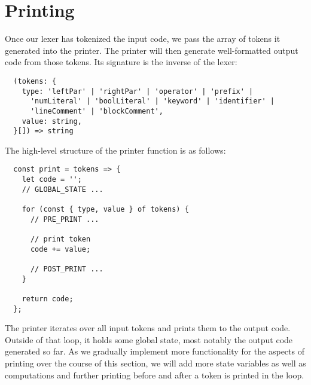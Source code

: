 \section{Printing}
Once our lexer has tokenized the input code,
we pass the array of tokens it generated into the printer.
The printer will then generate well-formatted output code from those tokens.
Its signature is the inverse of the lexer:
\begin{verbatim}
  (tokens: {
    type: 'leftPar' | 'rightPar' | 'operator' | 'prefix' |
      'numLiteral' | 'boolLiteral' | 'keyword' | 'identifier' |
      'lineComment' | 'blockComment',
    value: string,
  }[]) => string
\end{verbatim}

The high-level structure of the printer function is as follows:
\begin{verbatim}
  const print = tokens => {
    let code = '';
    // GLOBAL_STATE ...

    for (const { type, value } of tokens) {
      // PRE_PRINT ...

      // print token
      code += value;

      // POST_PRINT ...
    }

    return code;
  };
\end{verbatim}
The printer iterates over all input tokens
and prints them to the output code.
Outside of that loop, it holds some global state,
most notably the output code generated so far.
As we gradually implement
more functionality for the aspects of printing
over the course of this section,
we will add more state variables
as well as computations and further printing
before and after a token is printed in the loop.








